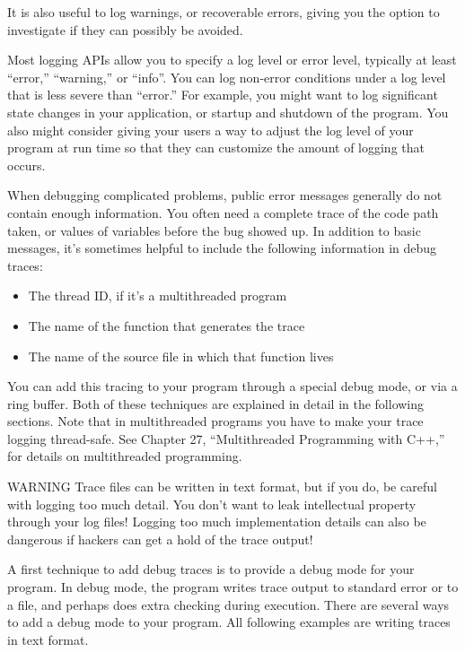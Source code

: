 It is also useful to log warnings, or recoverable errors, giving you the option to investigate if they can possibly be avoided.

Most logging APIs allow you to specify a log level or error level, typically at least “error,” “warning,” or “info”. You can log non-error conditions under a log level that is less severe than “error.” For example, you might want to log significant state changes in your application, or startup and shutdown of the program. You also might consider giving your users a way to adjust the log level of your program at run time so that they can customize the amount of logging that occurs.


When debugging complicated problems, public error messages generally do not contain enough information. You often need a complete trace of the code path taken, or values of variables before the bug showed up. In addition to basic messages, it’s sometimes helpful to include the following information in debug traces:

\begin{itemize}
\item
The thread ID, if it’s a multithreaded program

\item
The name of the function that generates the trace

\item
The name of the source file in which that function lives
\end{itemize}

You can add this tracing to your program through a special debug mode, or via a ring buffer. Both of these techniques are explained in detail in the following sections. Note that in multithreaded programs you have to make your trace logging thread-safe. See Chapter 27, “Multithreaded Programming with C++,” for details on multithreaded programming.

\begin{myWarning}{WARNING}
Trace files can be written in text format, but if you do, be careful with logging too much detail. You don’t want to leak intellectual property through your log files! Logging too much implementation details can also be dangerous if hackers can get a hold of the trace output!
\end{myWarning}


A first technique to add debug traces is to provide a debug mode for your program. In debug mode, the program writes trace output to standard error or to a file, and perhaps does extra checking during execution. There are several ways to add a debug mode to your program. All following examples are writing traces in text format.

